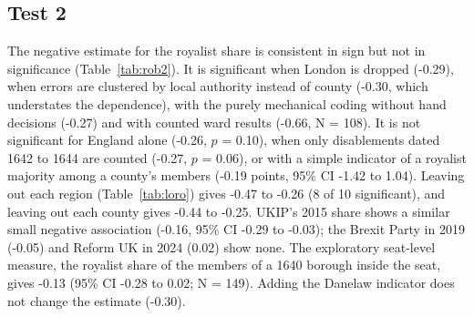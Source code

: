 \documentclass[11pt,a4paper]{article}
\begin{document}
\subsection{Test 2}
The negative estimate for the royalist share is consistent in sign but not in significance (Table~\ref{tab:rob2}). It is significant when London is dropped (-0.29), when errors are clustered by local authority instead of county (-0.30, which understates the dependence), with the purely mechanical coding without hand decisions (-0.27) and with counted ward results (-0.66, N = 108). It is not significant for England alone (-0.26, $p$ = 0.10), when only disablements dated 1642 to 1644 are counted (-0.27, $p$ = 0.06), or with a simple indicator of a royalist majority among a county's members (-0.19 points, 95\% CI -1.42 to 1.04). Leaving out each region (Table~\ref{tab:loro}) gives -0.47 to -0.26 (8 of 10 significant), and leaving out each county gives -0.44 to -0.25. UKIP's 2015 share shows a similar small negative association (-0.16, 95\% CI -0.29 to -0.03); the Brexit Party in 2019 (-0.05) and Reform UK in 2024 (0.02) show none. The exploratory seat-level measure, the royalist share of the members of a 1640 borough inside the seat, gives -0.13 (95\% CI -0.28 to 0.02; N = 149). Adding the Danelaw indicator does not change the estimate (-0.30).
\end{document}
